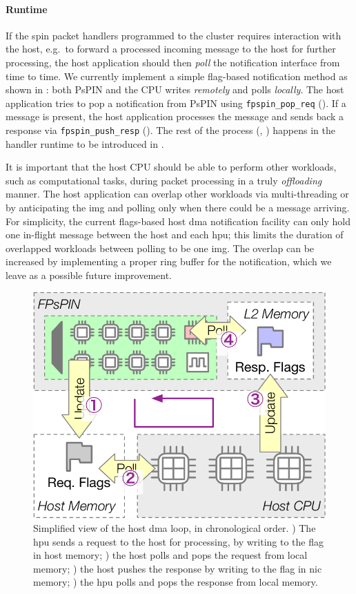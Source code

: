 \paragraph{Runtime} If the \ac{spin} packet handlers programmed to the cluster requires interaction with the host, e.g.\ to forward a processed incoming message to the host for further processing, the host application should then \emph{poll} the notification interface from time to time.  We currently implement a simple flag-based notification method as shown in : both PsPIN and the CPU writes \emph{remotely} and polls \emph{locally}.  The host application tries to pop a notification from PsPIN using \texttt{fpspin\_\-pop\_\-req} ().  If a message is present, the host application processes the message and sends back a response via \texttt{fpspin\_\-push\_\-resp} ().  The rest of the process (, ) happens in the handler runtime to be introduced in .

It is important that the host CPU should be able to perform other workloads, such as computational tasks, during packet processing in a truly \emph{offloading} manner.  The host application can overlap other workloads via multi-threading or by anticipating the \ac{img} and polling only when there could be a message arriving.  For simplicity, the current flags-based host \ac{dma} notification facility can only hold one in-flight message between the host and each \ac{hpu}; this limits the duration of overlapped workloads between polling to be one \ac{img}.  The overlap can be increased by implementing a proper ring buffer for the notification, which we leave as a possible future improvement.

\begin{figure}[tp]
    \centering
    \includegraphics[width=.5\textwidth]{figures/host-dma-req-resp.pdf}
    \caption[Simplified view of the host \ac{dma} loop]{Simplified view of the host \ac{dma} loop, in chronological order.  ) The \ac{hpu} sends a request to the host for processing, by writing to the flag in host memory; ) the host polls and pops the request from local memory; ) the host pushes the response by writing to the flag in \ac{nic} memory; ) the \ac{hpu} polls and pops the response from local memory.} \label{fig:host-dma-req-resp}
\end{figure}

